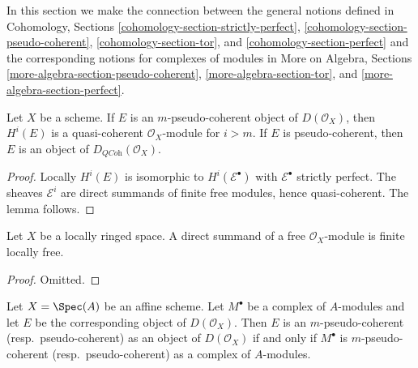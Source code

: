 \noindent
In this section we make the connection between the general
notions defined in
Cohomology, Sections \ref{cohomology-section-strictly-perfect},
\ref{cohomology-section-pseudo-coherent},
\ref{cohomology-section-tor}, and
\ref{cohomology-section-perfect}
and the corresponding notions for complexes of modules in
More on Algebra, Sections
\ref{more-algebra-section-pseudo-coherent},
\ref{more-algebra-section-tor}, and
\ref{more-algebra-section-perfect}.

\begin{lemma}
\label{lemma-pseudo-coherent}
Let $X$ be a scheme. If $E$ is an $m$-pseudo-coherent
object of $D(\mathcal{O}_X)$, then $H^i(E)$ is a quasi-coherent
$\mathcal{O}_X$-module for $i > m$.
If $E$ is pseudo-coherent, then $E$ is an object of
$D_{\textit{QCoh}}(\mathcal{O}_X)$.
\end{lemma}

\begin{proof}
Locally $H^i(E)$ is isomorphic to $H^i(\mathcal{E}^\bullet)$
with $\mathcal{E}^\bullet$ strictly perfect. The sheaves
$\mathcal{E}^i$ are direct summands of finite free modules,
hence quasi-coherent. The lemma follows.
\end{proof}

\begin{lemma}
\label{lemma-locally-ringed-space-direct-summand-free}
Let $X$ be a locally ringed space. A direct summand of a free
$\mathcal{O}_X$-module is finite locally free.
\end{lemma}

\begin{proof}
Omitted.
\end{proof}

\begin{lemma}
\label{lemma-pseudo-coherent-affine}
Let $X = \Spec(A)$ be an affine scheme. Let $M^\bullet$ be a
complex of $A$-modules and let $E$ be the corresponding object
of $D(\mathcal{O}_X)$. Then $E$ is an $m$-pseudo-coherent
(resp.\ pseudo-coherent) as an object of $D(\mathcal{O}_X)$
if and only if $M^\bullet$ is $m$-pseudo-coherent (resp.\ pseudo-coherent)
as a complex of $A$-modules.
\end{lemma}

